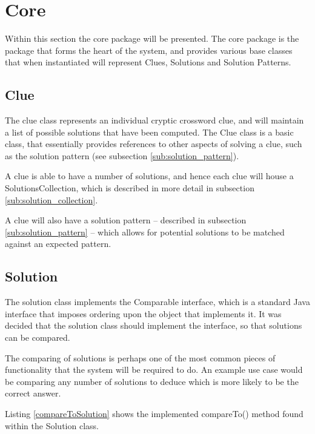 \section{Core}
\label{sec:core}

Within this section the core package will be presented. The core package is the 
package that forms the heart of the system, and provides various base classes
that when instantiated will represent Clues, Solutions and Solution Patterns.


\subsection{Clue}
\label{sub:clue}

The clue class represents an individual cryptic crossword clue, and will 
maintain a list of possible solutions that have been computed. The Clue class is
a basic class, that essentially provides references to other aspects of solving 
a clue, such as the solution pattern (see subsection \ref{sub:solution_pattern}).

A clue is able to have a number of solutions, and hence each clue will house a 
SolutionsCollection, which is described in more detail in subsection 
\ref{sub:solution_collection}.

A clue will also have a solution pattern -- described in subsection 
\ref{sub:solution_pattern} -- which allows for potential solutions to be matched 
against an expected pattern.


\subsection{Solution}
\label{sub:solution}

The solution class implements the Comparable interface, which is a standard Java
interface that imposes ordering upon the object that implements it. It was 
decided that the solution class should implement the interface, so that 
solutions can be compared.

The comparing of solutions is perhaps one of the most common pieces of 
functionality that the system will be required to do. An example use case would
be comparing any number of solutions to deduce which is more likely to be the 
correct answer.

Listing \ref{compareToSolution} shows the implemented compareTo() method found
within the Solution class.

